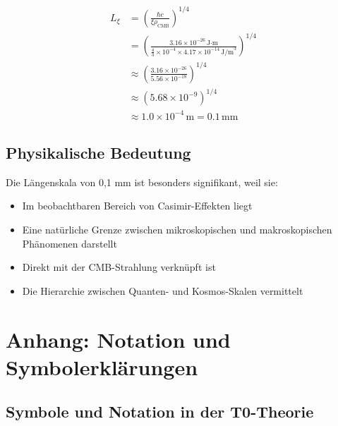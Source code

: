 \documentclass[12pt,a4paper]{article}
\numberwithin{equation}{section}
\begin{document}
	\begin{align*}
		L_\xi &= \left(\frac{\hbar c}{\xi \rho_{\text{CMB}}}\right)^{1/4} \\
		&= \left(\frac{3.16 \times 10^{-26}\,\text{J·m}}{\frac{4}{3} \times 10^{-4} \times 4.17 \times 10^{-14}\,\text{J/m}^3}\right)^{1/4} \\
		&\approx \left(\frac{3.16 \times 10^{-26}}{5.56 \times 10^{-18}}\right)^{1/4} \\
		&\approx \left(5.68 \times 10^{-9}\right)^{1/4} \\
		&\approx 1.0 \times 10^{-4}\,\text{m} = 0.1\,\text{mm}
	\end{align*}
	
	\subsection*{Physikalische Bedeutung}
	
	Die Längenskala von 0,1 mm ist besonders signifikant, weil sie:
	\begin{itemize}
		\item Im beobachtbaren Bereich von Casimir-Effekten liegt
		\item Eine natürliche Grenze zwischen mikroskopischen und makroskopischen Phänomenen darstellt
		\item Direkt mit der CMB-Strahlung verknüpft ist
		\item Die Hierarchie zwischen Quanten- und Kosmos-Skalen vermittelt
	\end{itemize}
	\section*{Anhang: Notation und Symbolerklärungen}
	
	\subsection*{Symbole und Notation in der T0-Theorie}
	
\end{document}
